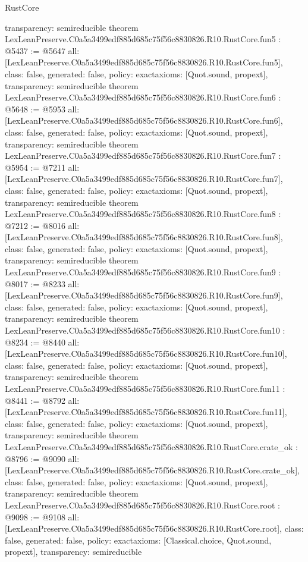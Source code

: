 \begin{lexlean}{RustCore}
\begin{coremodule}
{  transparency: semireducible
}
theorem LexLeanPreserve.C0a5a3499edf885d685c75f56c8830826.R10.RustCore.fun5 : @5437 := @5647 {
  all: [LexLeanPreserve.C0a5a3499edf885d685c75f56c8830826.R10.RustCore.fun5],
  class: false,
  generated: false,
  policy: exact{axioms: [Quot.sound, propext]},
  transparency: semireducible
}
theorem LexLeanPreserve.C0a5a3499edf885d685c75f56c8830826.R10.RustCore.fun6 : @5648 := @5953 {
  all: [LexLeanPreserve.C0a5a3499edf885d685c75f56c8830826.R10.RustCore.fun6],
  class: false,
  generated: false,
  policy: exact{axioms: [Quot.sound, propext]},
  transparency: semireducible
}
theorem LexLeanPreserve.C0a5a3499edf885d685c75f56c8830826.R10.RustCore.fun7 : @5954 := @7211 {
  all: [LexLeanPreserve.C0a5a3499edf885d685c75f56c8830826.R10.RustCore.fun7],
  class: false,
  generated: false,
  policy: exact{axioms: [Quot.sound, propext]},
  transparency: semireducible
}
theorem LexLeanPreserve.C0a5a3499edf885d685c75f56c8830826.R10.RustCore.fun8 : @7212 := @8016 {
  all: [LexLeanPreserve.C0a5a3499edf885d685c75f56c8830826.R10.RustCore.fun8],
  class: false,
  generated: false,
  policy: exact{axioms: [Quot.sound, propext]},
  transparency: semireducible
}
theorem LexLeanPreserve.C0a5a3499edf885d685c75f56c8830826.R10.RustCore.fun9 : @8017 := @8233 {
  all: [LexLeanPreserve.C0a5a3499edf885d685c75f56c8830826.R10.RustCore.fun9],
  class: false,
  generated: false,
  policy: exact{axioms: [Quot.sound, propext]},
  transparency: semireducible
}
theorem LexLeanPreserve.C0a5a3499edf885d685c75f56c8830826.R10.RustCore.fun10 : @8234 := @8440 {
  all: [LexLeanPreserve.C0a5a3499edf885d685c75f56c8830826.R10.RustCore.fun10],
  class: false,
  generated: false,
  policy: exact{axioms: [Quot.sound, propext]},
  transparency: semireducible
}
theorem LexLeanPreserve.C0a5a3499edf885d685c75f56c8830826.R10.RustCore.fun11 : @8441 := @8792 {
  all: [LexLeanPreserve.C0a5a3499edf885d685c75f56c8830826.R10.RustCore.fun11],
  class: false,
  generated: false,
  policy: exact{axioms: [Quot.sound, propext]},
  transparency: semireducible
}
theorem LexLeanPreserve.C0a5a3499edf885d685c75f56c8830826.R10.RustCore.crate_ok : @8796 := @9090 {
  all: [LexLeanPreserve.C0a5a3499edf885d685c75f56c8830826.R10.RustCore.crate_ok],
  class: false,
  generated: false,
  policy: exact{axioms: [Quot.sound, propext]},
  transparency: semireducible
}
theorem LexLeanPreserve.C0a5a3499edf885d685c75f56c8830826.R10.RustCore.root : @9098 := @9108 {
  all: [LexLeanPreserve.C0a5a3499edf885d685c75f56c8830826.R10.RustCore.root],
  class: false,
  generated: false,
  policy: exact{axioms: [Classical.choice, Quot.sound, propext]},
  transparency: semireducible
}


\end{coremodule}
\end{lexlean}
